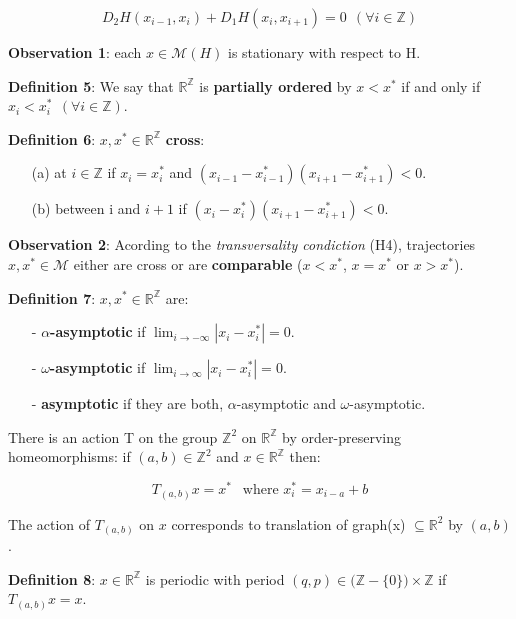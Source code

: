 \documentclass{article}
\begin{document}
	$$	
		D_2 H( x_{i -1}, x_{i}) + D_1 H( x_{i}, x_{i + 1}) = 0 \ \ (\forall i \in \mathbb{Z}) 
	$$
	
\noindent \textbf{Observation 1}: each $x \in \mathcal{M}(H)$ is stationary with respect to H.

\noindent \textbf{Definition 5}: We say that $\mathbb{R}^{\mathbb{Z}}$ is \textbf{partially ordered} by $x < x^{*}$ if and only if $x_{i} < x_{i}^{*} \ \ (\forall i \in \mathbb{Z})$.


\noindent \textbf{Definition 6}: $x, x^{*} \in \mathbb{R}^{\mathbb{Z}}$ \textbf{cross}:
	\begin{itemize}
		\item[(a)] at $i \in \mathbb{Z}$ if $x_i = x_{i}^{*}$ and $(x_{i - 1} - x^{*}_{i - 1}) (x_{i + 1} - x^{*}_{i + 1}) < 0 $.
		\item[(b)] between i and $i + 1$ if $(x_{i} - x^{*}_{i}) (x_{i + 1} - x^{*}_{i + 1}) < 0 $.
	\end{itemize}

\noindent \textbf{Observation 2}: Acording to the \textit{transversality condiction} (H4), trajectories $x, x^{*} \in \mathcal{M}$ either are cross or are \textbf{comparable} ($x < x^{*}$, $x = x^{*}$ or $x > x^{*}$).  

\noindent \textbf{Definition 7}:  $x, x^{*} \in \mathbb{R}^{\mathbb{Z}}$ are:
	\begin{itemize}
		\item[-] \textbf{$\alpha$-asymptotic} if $\lim_{i \rightarrow - \infty} | x_i - x_{i}^{*} | = 0$.
		\item[-] \textbf{$\omega$-asymptotic} if $\lim_{i \rightarrow  \infty} | x_i - x_{i}^{*} | = 0$.
		\item[-] \textbf{asymptotic} if they are both, $\alpha$-asymptotic and $\omega$-asymptotic.
	\end{itemize}


\noindent There is an action T on the group $\mathbb{Z}^2$ on $\mathbb{R}^{\mathbb{Z}}$ by order-preserving homeomorphisms: if $(a, b) \in \mathbb{Z}^{2}$ and $x \in \mathbb{R}^{\mathbb{Z}}$ then:

	$$
		T_{(a, b)} x = x^{*} \ \ \text{  where  } x^{*}_{i} = x_{i - a} + b
	$$

The action of $T_{(a, b)}$ on $x$ corresponds to translation of graph(x) $\subseteq \mathbb{R}^{2}$ by $(a, b)$.

\noindent \textbf{Definition 8}: $x \in \mathbb{R}^{\mathbb{Z}}$ is periodic with period $(q, p) \in \big( \mathbb{Z} - \{ 0 \} \big) \times \mathbb{Z}$ if $T_{(a, b)} x = x$.
\end{document}
